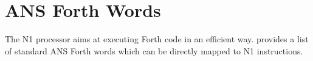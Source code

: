 
\section{ANS Forth Words}
\label{N1_words}

The N1 processor aims at executing Forth code in an efficient way.
 provides a list of standard ANS Forth\cite{dpans94} words 
which can be directly mapped to N1 instructions. 

